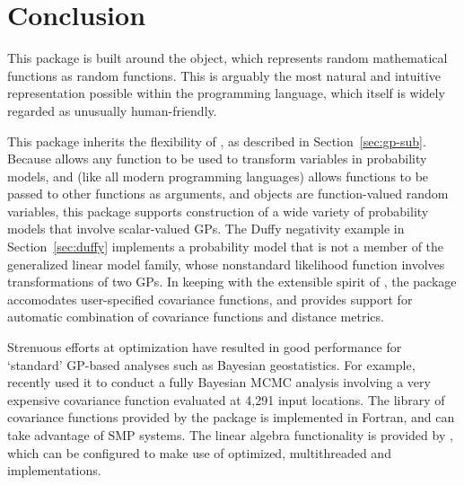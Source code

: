\documentclass[article]{jss}
\begin{document}
% 

\section{Conclusion}

This package is built around the  object, which represents random mathematical functions as random  functions. This is arguably the most natural and intuitive representation possible within the  programming language, which itself is widely regarded as unusually human-friendly.

This package inherits the flexibility of , as described in Section~\ref{sec:gp-sub}. Because  allows any  function to be used to transform variables in probability models, and  (like all modern programming languages) allows functions to be passed to other functions as arguments, and  objects are function-valued random variables, this package supports construction of a wide variety of probability models that involve scalar-valued GPs. The Duffy negativity example in Section~\ref{sec:duffy} implements a probability model that is not a member of the generalized linear model family, whose nonstandard likelihood function involves transformations of two GPs. In keeping with the extensible spirit of , the package accomodates user-specified covariance functions, and provides support for automatic combination of covariance functions and distance metrics.

Strenuous efforts at optimization have resulted in good performance for `standard' GP-based analyses such as Bayesian geostatistics. For example, \cite{map} recently used it to conduct a fully Bayesian MCMC analysis involving a very expensive covariance function evaluated at 4,291 input locations. The library of covariance functions provided by the package is implemented in Fortran, and can take advantage of SMP systems. The linear algebra functionality is provided by , which can be configured to make use of optimized, multithreaded  and  \citep{blas} implementations. 
\end{document}
